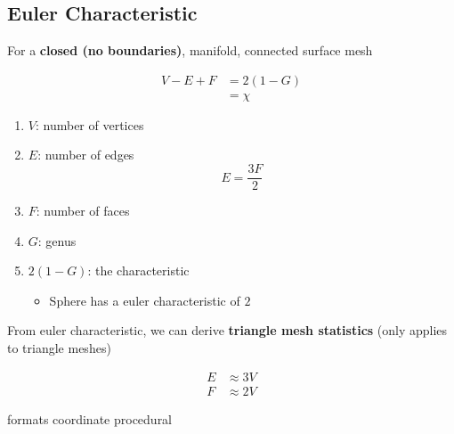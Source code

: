  \subsection{Euler Characteristic}

    For a \textbf{closed (no boundaries)}, manifold, connected surface mesh

    \begin{align}
      V - E + F &= 2 \left( 1 - G \right) \\
      &= \chi
    \end{align}

    \begin{enumerate}
      \item $ V $: number of vertices
      \item $ E $: number of edges
      \begin{equation}
        E = \frac{3F}{2}
      \end{equation}

      \item $ F $: number of faces
      \item $ G $: genus
      \item $ 2 \left( 1 - G \right) $: the characteristic
      \begin{itemize}
        \item Sphere has a euler characteristic of $ 2 $
      \end{itemize}
    \end{enumerate}

    From euler characteristic, we can derive \textbf{triangle mesh statistics}
    (only applies to triangle meshes)

    \begin{align}
      E &\approx 3V \\
      F &\approx 2V
    \end{align}

{formats}
{coordinate}
{procedural}
